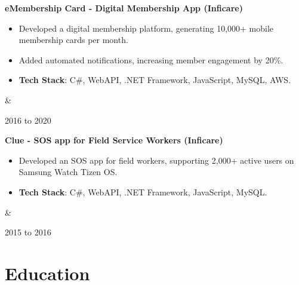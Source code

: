 \documentclass[10pt, letterpaper]{article}
\newenvironment{highlights}{
        \begin{itemize}[
                topsep=0pt,
                parsep=0.10 cm,
                partopsep=0pt,
                itemsep=0pt,
                after=\vspace{-1\baselineskip},
                leftmargin=0.4 cm + 3pt
            ]
    }{
        \end{itemize}
    } %
\let\originalTabularx\tabularx
\let\originalEndTabularx\endtabularx
\renewenvironment{tabularx}{\bgroup\centering\originalTabularx}{\originalEndTabularx\par\egroup}
\begin{document}
        \vspace{0.2 cm}
        \begin{tabularx}{
            \textwidth-0.4 cm-0.13cm
        }{
            K{0.2 cm}
            R{4.1 cm}
        }
            \textbf{eMembership Card - Digital Membership App (Inficare)}

            \vspace{0.10 cm}

            \begin{highlights}
                \item Developed a digital membership platform, generating 10,000+ mobile membership cards per month.
                \item Added automated notifications, increasing member engagement by 20\%.
                \item \textbf{Tech Stack}: C\#, WebAPI, .NET Framework, JavaScript, MySQL, AWS.
            \end{highlights}
            &
            

            2016 to 2020
        \end{tabularx}


        \vspace{0.2 cm}
        \begin{tabularx}{
            \textwidth-0.4 cm-0.13cm
        }{
            K{0.2 cm}
            R{4.1 cm}
        }
            \textbf{Clue - SOS app for Field Service Workers (Inficare)}

            \vspace{0.10 cm}

            \begin{highlights}
                \item Developed an SOS app for field workers, supporting 2,000+ active users on Samsung Watch Tizen OS.
                \item \textbf{Tech Stack}: C\#, WebAPI, .NET Framework, JavaScript, MySQL.
            \end{highlights}
            &
            

            2015 to 2016
        \end{tabularx}



    
    \section{Education}
\end{document}
